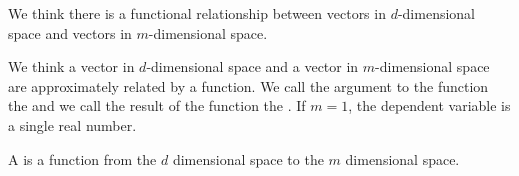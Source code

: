 
\sbasic
















\sstart
{}


We think there
is a functional
relationship
between vectors in $d$-dimensional
space and vectors
in $m$-dimensional space.


We think a vector in
$d$-dimensional space
and a vector in $m$-dimensional
space are approximately related
by a function.
We call the argument to the
function the 
and we call the result
of the function the .
If $m = 1$, the dependent variable
is a single real number.

A  is a function
from the $d$ dimensional space
to the $m$ dimensional space.
\strats
